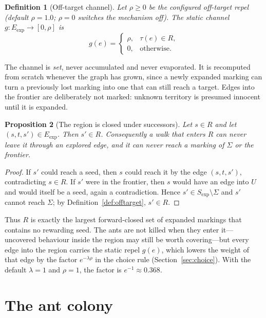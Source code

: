 \documentclass[11pt,a4paper]{article}
\newtheorem{definition}{Definition}[section]
\newtheorem{proposition}[definition]{Proposition}
\newcommand{\Seeds}{\Sigma}
\newcommand{\Off}{R}
\begin{document}
\begin{definition}[Off-target channel]\label{def:offtarget-channel}
Let $\rho\ge0$ be the configured off-target repel (default $\rho=1.0$;
$\rho=0$ switches the mechanism off).  The static channel
$g\colon E_{\mathrm{exp}}\to[0,\rho]$ is
\[
  g(e)=
  \begin{cases}
    \rho, & \tau(e)\in\Off,\\
    0, & \text{otherwise}.
  \end{cases}
\]
\end{definition}

The channel is \emph{set}, never accumulated and never evaporated.  It is
recomputed from scratch whenever the graph has grown, since a newly expanded
marking can turn a previously lost marking into one that can still reach a
target.  Edges into the frontier are deliberately not marked: unknown
territory is presumed innocent until it is expanded.

\begin{proposition}[The region is closed under successors]\label{prop:closed}
Let $s\in\Off$ and let $(s,t,s')\in E_{\mathrm{exp}}$.  Then $s'\in\Off$.
Consequently a walk that enters $\Off$ can never leave it through an explored
edge, and it can never reach a marking of $\Seeds$ or the frontier.
\end{proposition}

\begin{proof}
If $s'$ could reach a seed, then $s$ could reach it by the edge $(s,t,s')$,
contradicting $s\in\Off$.  If $s'$ were in the frontier, then $s$ would have
an edge into $U$ and would itself be a seed, again a contradiction.  Hence
$s'\in S_{\mathrm{exp}}\setminus\Seeds$ and $s'$ cannot reach $\Seeds$; by
Definition~\ref{def:offtarget}, $s'\in\Off$.
\end{proof}

Thus $\Off$ is exactly the largest forward-closed set of expanded markings
that contains no rewarding seed.  The ants are not killed when they enter
it---uncovered behaviour inside the region may still be worth covering---but
every edge into the region carries the static repel $g(e)$, which lowers the
weight of that edge by the factor $e^{-\lambda\rho}$ in the choice rule
(Section~\ref{sec:choice}).  With the default $\lambda=1$ and $\rho=1$, the
factor is $e^{-1}\approx0.368$.

\section{The ant colony}\label{sec:aco}
\end{document}

